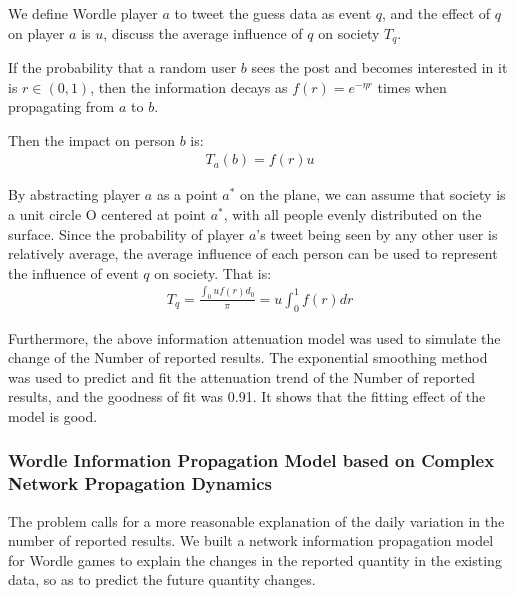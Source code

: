 \documentclass{mcmthesis}
\begin{document}
We define Wordle player $a$ to tweet the guess data as event $q$, and the effect of $q$ on player $a$ is $u$, discuss the average influence of $q$ on society $T_q$.

If the probability that a random user $b$ sees the post and becomes interested in it is $r \in (0,1)$, then the information decays as $f(r)=e^{-\eta  r}$ times when propagating from $a$ to $b$.

Then the impact on person $b$ is:	
\begin{eqnarray}
	T_a(b)=f(r)u
\end{eqnarray}

By abstracting player $a$ as a point $a^*$ on the plane, we can assume that society is a unit circle O centered at point $a^*$, with all people evenly distributed on the surface. Since the probability of player $a$'s tweet being seen by any other user is relatively average, the average influence of each person can be used to represent the influence of event $q$ on society. That is:
\begin{eqnarray}
	T_{q}  =  \frac{\int_{0} u f(r) d_0}{\pi}  =  u \int_{0}^{1} f(r) d r
\end{eqnarray}

Furthermore, the above information attenuation model was used to simulate the change of the Number of reported results. The exponential smoothing method was used to predict and fit the attenuation trend of the Number of reported results, and the goodness of fit was 0.91. It shows that the fitting effect of the model is good.

\subsubsection{Wordle Information Propagation Model based on Complex Network Propagation Dynamics}
The problem calls for a more reasonable explanation of the daily variation in the number of reported results. We built a network information propagation model for Wordle games to explain the changes in the reported quantity in the existing data, so as to predict the future quantity changes.
\end{document}
